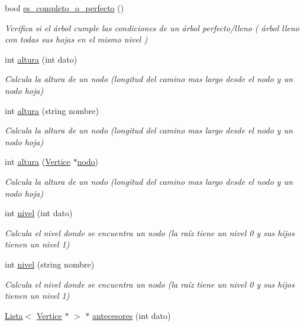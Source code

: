 \begin{DoxyCompactItemize}
bool \hyperlink{classArbol_a9e472df85f3bb1aa5c90f8157ad6ff22}{es\+\_\+completo\+\_\+o\+\_\+perfecto} ()
\begin{DoxyCompactList}\small\item\em Verifica si el árbol cumple las condiciones de un árbol perfecto/lleno ( árbol lleno con todas sus hojas en el mismo nivel ) \end{DoxyCompactList}\item 
int \hyperlink{classArbol_a98151655f0dab81b40d34f87fbbd90cd}{altura} (int dato)
\begin{DoxyCompactList}\small\item\em Calcula la altura de un nodo (longitud del camino mas largo desde el nodo y un nodo hoja) \end{DoxyCompactList}\item 
int \hyperlink{classArbol_a7a79cb43ca30b5120f1a8ebe3afbe22c}{altura} (string nombre)
\begin{DoxyCompactList}\small\item\em Calcula la altura de un nodo (longitud del camino mas largo desde el nodo y un nodo hoja) \end{DoxyCompactList}\item 
int \hyperlink{classArbol_a9f8928b4c72e2d484ef75cf3633c22ce}{altura} (\hyperlink{classVertice}{Vertice} $\ast$\hyperlink{classnodo}{nodo})
\begin{DoxyCompactList}\small\item\em Calcula la altura de un nodo (longitud del camino mas largo desde el nodo y un nodo hoja) \end{DoxyCompactList}\item 
int \hyperlink{classArbol_accd2dd2f8012067c1a2d77fd14c64546}{nivel} (int dato)
\begin{DoxyCompactList}\small\item\em Calcula el nivel donde se encuentra un nodo (la raíz tiene un nivel 0 y sus hijos tienen un nivel 1) \end{DoxyCompactList}\item 
int \hyperlink{classArbol_a3a8a414e8e3f45bf90c481649928a86d}{nivel} (string nombre)
\begin{DoxyCompactList}\small\item\em Calcula el nivel donde se encuentra un nodo (la raíz tiene un nivel 0 y sus hijos tienen un nivel 1) \end{DoxyCompactList}\item 
\hyperlink{classLista}{Lista}$<$ \hyperlink{classVertice}{Vertice} $\ast$ $>$ $\ast$ \hyperlink{classArbol_ac7ff5e2f436a1e83e24cbdd0b2cc827b}{antecesores} (int dato)

\end{DoxyCompactItemize}
